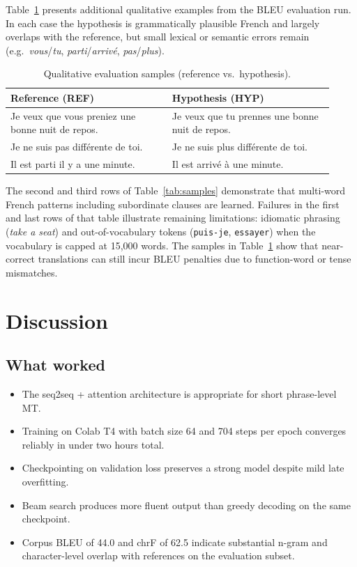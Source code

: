 \documentclass[12pt]{article}
\begin{document}
Table~\ref{tab:qual} presents additional qualitative examples from the BLEU evaluation run. In each case the hypothesis is grammatically plausible French and largely overlaps with the reference, but small lexical or semantic errors remain (e.g.\ \emph{vous}/\emph{tu}, \emph{parti}/\emph{arriv\'e}, \emph{pas}/\emph{plus}).

\begin{table}[H]
  \centering
  \caption{Qualitative evaluation samples (reference vs.\ hypothesis).}
  \label{tab:qual}
  \small
  \begin{tabular}{@{}p{0.46\linewidth}p{0.46\linewidth}@{}}
    \toprule
    \textbf{Reference (REF)} & \textbf{Hypothesis (HYP)} \\
    \midrule
    Je veux que vous preniez une bonne nuit de repos. &
    Je veux que tu prennes une bonne nuit de repos. \\
    Je ne suis pas diff\'erente de toi. &
    Je ne suis plus diff\'erente de toi. \\
    Il est parti il y a une minute. &
    Il est arriv\'e \`a une minute. \\
    \bottomrule
  \end{tabular}
\end{table}

The second and third rows of Table~\ref{tab:samples} demonstrate that multi-word French patterns including subordinate clauses are learned. Failures in the first and last rows of that table illustrate remaining limitations: idiomatic phrasing (\emph{take a seat}) and out-of-vocabulary tokens (\texttt{puis-je}, \texttt{essayer}) when the vocabulary is capped at 15{,}000 words. The samples in Table~\ref{tab:qual} show that near-correct translations can still incur BLEU penalties due to function-word or tense mismatches.

\section{Discussion}
\label{sec:discussion}

\subsection{What worked}
\begin{itemize}
  \item The seq2seq + attention architecture is appropriate for short phrase-level MT.
  \item Training on Colab T4 with batch size 64 and 704 steps per epoch converges reliably in under two hours total.
  \item Checkpointing on validation loss preserves a strong model despite mild late overfitting.
  \item Beam search produces more fluent output than greedy decoding on the same checkpoint.
  \item Corpus BLEU of 44.0 and chrF of 62.5 indicate substantial n-gram and character-level overlap with references on the evaluation subset.
\end{itemize}
\end{document}

